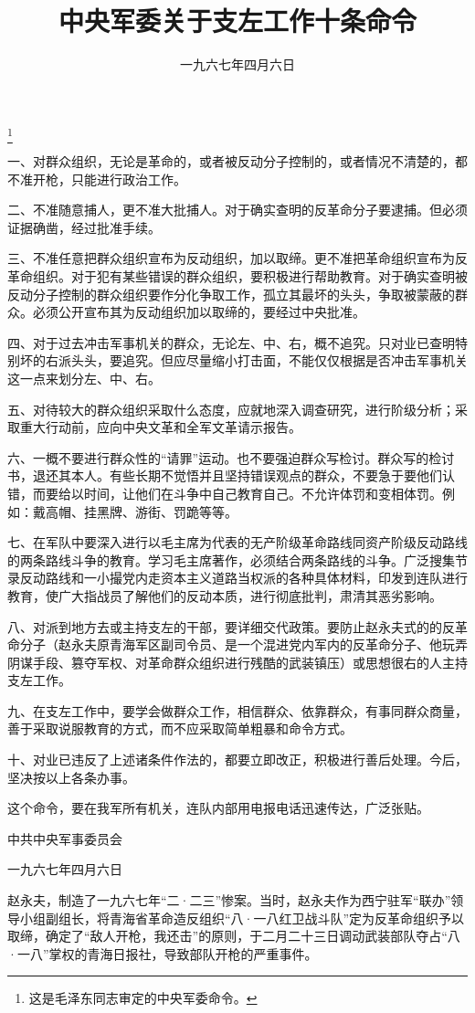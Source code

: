 
\title{中央军委关于支左工作十条命令}
\date{一九六七年四月六日}
\thanks{这是毛泽东同志审定的中央军委命令。}
\maketitle


一、对群众组织，无论是革命的，或者被反动分子控制的，或者情况不清楚的，都不准开枪，只能进行政治工作。

二、不准随意捕人，更不准大批捕人。对于确实查明的反革命分子要逮捕。但必须证据确凿，经过批准手续。

三、不准任意把群众组织宣布为反动组织，加以取缔。更不准把革命组织宣布为反革命组织。对于犯有某些错误的群众组织，要积极进行帮助教育。对于确实查明被反动分子控制的群众组织要作分化争取工作，孤立其最坏的头头，争取被蒙蔽的群众。必须公开宣布其为反动组织加以取缔的，要经过中央批准。

四、对于过去冲击军事机关的群众，无论左、中、右，概不追究。只对业已查明特别坏的右派头头，要追究。但应尽量缩小打击面，不能仅仅根据是否冲击军事机关这一点来划分左、中、右。

五、对待较大的群众组织采取什么态度，应就地深入调查研究，进行阶级分析；采取重大行动前，应向中央文革和全军文革请示报告。

六、一概不要进行群众性的“请罪”运动。也不要强迫群众写检讨。群众写的检讨书，退还其本人。有些长期不觉悟并且坚持错误观点的群众，不要急于要他们认错，而要给以时间，让他们在斗争中自己教育自己。不允许体罚和变相体罚。例如：戴高帽、挂黑牌、游街、罚跪等等。

七、在军队中要深入进行以毛主席为代表的无产阶级革命路线同资产阶级反动路线的两条路线斗争的教育。学习毛主席著作，必须结合两条路线的斗争。广泛搜集节录反动路线和一小撮党内走资本主义道路当权派的各种具体材料，印发到连队进行教育，使广大指战员了解他们的反动本质，进行彻底批判，肃清其恶劣影响。

八、对派到地方去或主持支左的干部，要详细交代政策。要防止赵永夫式的的反革命分子（赵永夫原青海军区副司令员、是一个混进党内军内的反革命分子、他玩弄阴谋手段、篡夺军权、对革命群众组织进行残酷的武装镇压）或思想很右的人主持支左工作。

九、在支左工作中，要学会做群众工作，相信群众、依靠群众，有事同群众商量，善于采取说服教育的方式，而不应采取简单粗暴和命令方式。

十、对业已违反了上述诸条件作法的，都要立即改正，积极进行善后处理。今后，坚决按以上各条办事。

这个命令，要在我军所有机关，连队内部用电报电话迅速传达，广泛张贴。

中共中央军事委员会

一九六七年四月六日

\begin{maonote}
赵永夫，制造了一九六七年“二·二三”惨案。当时，赵永夫作为西宁驻军“联办”领导小组副组长，将青海省革命造反组织“八·一八红卫战斗队”定为反革命组织予以取缔，确定了“敌人开枪，我还击”的原则，于二月二十三日调动武装部队夺占“八·一八”掌权的青海日报社，导致部队开枪的严重事件。
\end{maonote}
